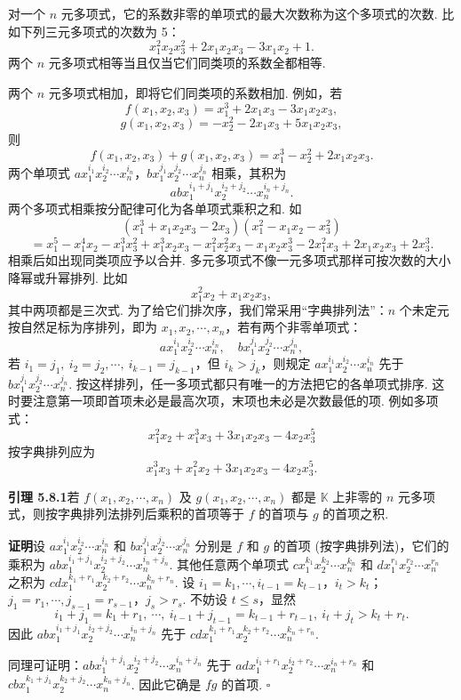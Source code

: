 \documentclass[UTF8,12pt,a4paper,fontset=fandol]{ctexart}
\begin{document}
对一个 $n$ 元多项式，它的系数非零的单项式的最大次数称为这个多项式的次数. 比如下列三元多项式的次数为 5：
\[
x_1^2x_2x_3^2+2x_1x_2x_3-3x_1x_2+1.
\]
两个 $n$ 元多项式相等当且仅当它们同类项的系数全都相等.

两个 $n$ 元多项式相加，即将它们同类项的系数相加. 例如，若
\[
f(x_1,x_2,x_3)=x_1^3+2x_1x_3-3x_1x_2x_3,
\]
\[
g(x_1,x_2,x_3)=-x_2^2-2x_1x_3+5x_1x_2x_3,
\]
则
\[
f(x_1,x_2,x_3)+g(x_1,x_2,x_3)=x_1^3-x_2^2+2x_1x_2x_3.
\]
两个单项式 $ax_1^{i_1}x_2^{i_2}\cdots x_n^{i_n}$，$bx_1^{j_1}x_2^{j_2}\cdots x_n^{j_n}$ 相乘，其积为
\[
abx_1^{i_1+j_1}x_2^{i_2+j_2}\cdots x_n^{i_n+j_n}.
\]
两个多项式相乘按分配律可化为各单项式乘积之和. 如
\[
(x_1^3+x_1x_2x_3-2x_3)(x_1^2-x_1x_2-x_3^2)
\]
\[
=x_1^5-x_1^4x_2-x_1^3x_3^2+x_1^3x_2x_3-x_1^2x_2^2x_3-x_1x_2x_3^3-2x_1^2x_3+2x_1x_2x_3+2x_3^3.
\]
相乘后如出现同类项应予以合并. 多元多项式不像一元多项式那样可按次数的大小降幂或升幂排列. 比如
\[
x_1^2x_2+x_1x_2x_3,
\]
其中两项都是三次式. 为了给它们排次序，我们常采用“字典排列法”：$n$ 个未定元按自然足标为序排列，即为 $x_1,x_2,\cdots,x_n$，若有两个非零单项式：
\[
ax_1^{i_1}x_2^{i_2}\cdots x_n^{i_n},\quad bx_1^{j_1}x_2^{j_2}\cdots x_n^{j_n},
\]
若 $i_1=j_1,\ i_2=j_2,\cdots,\ i_{k-1}=j_{k-1}$，但 $i_k>j_k$，则规定 $ax_1^{i_1}x_2^{i_2}\cdots x_n^{i_n}$ 先于 $bx_1^{j_1}x_2^{j_2}\cdots x_n^{j_n}$. 按这样排列，任一多项式都只有唯一的方法把它的各单项式排序. 这时要注意第一项即首项未必是最高次项，末项也未必是次数最低的项. 例如多项式：
\[
x_1^2x_2+x_1^3x_3+3x_1x_2x_3-4x_2x_3^5
\]
按字典排列应为
\[
x_1^3x_3+x_1^2x_2+3x_1x_2x_3-4x_2x_3^5.
\]

\noindent\textbf{引理 5.8.1}\quad 若 $f(x_1,x_2,\cdots,x_n)$ 及 $g(x_1,x_2,\cdots,x_n)$ 都是 $\mathbb{K}$ 上非零的 $n$ 元多项式，则按字典排列法排列后乘积的首项等于 $f$ 的首项与 $g$ 的首项之积.

\noindent\textbf{证明}\quad 设 $ax_1^{i_1}x_2^{i_2}\cdots x_n^{i_n}$ 和 $bx_1^{j_1}x_2^{j_2}\cdots x_n^{j_n}$ 分别是 $f$ 和 $g$ 的首项 (按字典排列法)，它们的乘积为 $abx_1^{i_1+j_1}x_2^{i_2+j_2}\cdots x_n^{i_n+j_n}$. 其他任意两个单项式 $cx_1^{k_1}x_2^{k_2}\cdots x_n^{k_n}$ 和 $dx_1^{r_1}x_2^{r_2}\cdots x_n^{r_n}$ 之积为 $cdx_1^{k_1+r_1}x_2^{k_2+r_2}\cdots x_n^{k_n+r_n}$. 设 $i_1=k_1,\cdots,i_{t-1}=k_{t-1}$，$i_t>k_t$；$j_1=r_1,\cdots,j_{s-1}=r_{s-1}$，$j_s>r_s$. 不妨设 $t\leq s$，显然
\[
i_1+j_1=k_1+r_1,\ \cdots,\ i_{t-1}+j_{t-1}=k_{t-1}+r_{t-1},\ i_t+j_t>k_t+r_t.
\]
因此 $abx_1^{i_1+j_1}x_2^{i_2+j_2}\cdots x_n^{i_n+j_n}$ 先于 $cdx_1^{k_1+r_1}x_2^{k_2+r_2}\cdots x_n^{k_n+r_n}$.

同理可证明：$abx_1^{i_1+j_1}x_2^{i_2+j_2}\cdots x_n^{i_n+j_n}$ 先于 $adx_1^{i_1+r_1}x_2^{i_2+r_2}\cdots x_n^{i_n+r_n}$ 和 $cbx_1^{k_1+j_1}x_2^{k_2+j_2}\cdots x_n^{k_n+j_n}$. 因此它确是 $fg$ 的首项. $\square$
\end{document}
